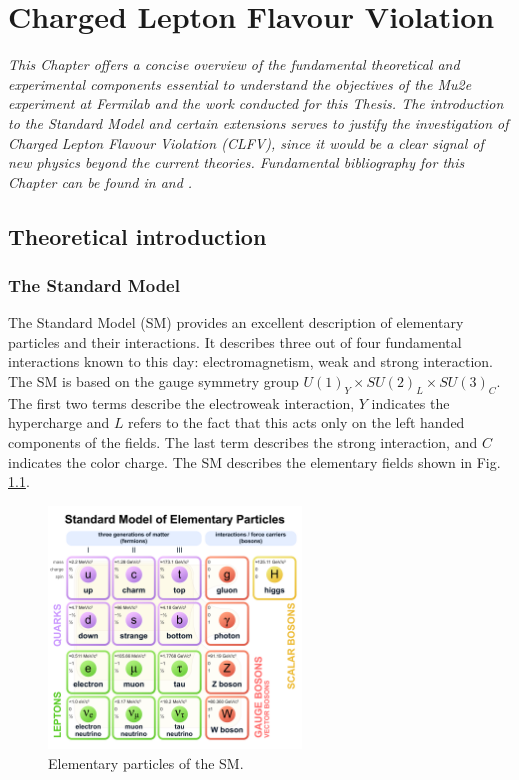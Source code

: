 \chapter{Charged Lepton Flavour Violation}\label{intr}
\textit{This Chapter offers a concise overview of the fundamental 
theoretical and experimental components essential to understand the objectives 
of the Mu2e experiment at Fermilab and the work conducted for this 
Thesis. The introduction to the Standard Model and certain extensions serves to 
justify the investigation of Charged Lepton Flavour Violation (CLFV), 
since it would be a clear signal of new physics beyond the current theories. 
Fundamental bibliography for this Chapter can be found in \cite{Bernstein_2013} and \cite{clfv_signorelli}.}
\section{Theoretical introduction}
\subsection{The Standard Model}
The Standard Model (SM) provides an excellent description of elementary particles and their interactions.
It describes three out of 
four fundamental interactions known to this day: electromagnetism, weak and strong interaction.
The SM is 
based on the gauge symmetry group $U(1)_Y \times SU(2)_L \times SU(3)_C$. The 
first two terms describe the electroweak interaction, $Y$ indicates 
the hypercharge and $L$ refers to the fact that this acts only on the left handed components of the fields.
The last term describes the strong interaction, and $C$ indicates the color charge.
The SM describes the elementary fields shown in Fig. \ref{fig:sm}.

\begin{figure}[!h]
\centering
\includegraphics[width =0.6\textwidth]{figures/pdf/Standard_Model_of_Elementary_Particles.pdf}
\caption[Elementary particles of the Standard Model.]{Elementary particles of the SM.}
\label{fig:sm}
\end{figure}


